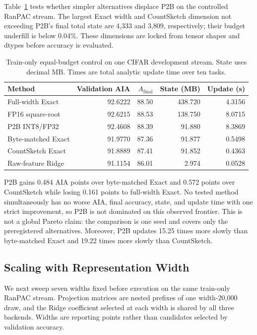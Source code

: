 \documentclass[runningheads]{llncs}
\begin{document}
Table~\ref{tab:equal-budget} tests whether simpler alternatives displace P2B
on the controlled RanPAC stream. The largest Exact width and CountSketch
dimension not exceeding P2B's final total state are 4,333 and 3,809,
respectively; their budget underfill is below 0.04\%. These dimensions are
locked from tensor shapes and dtypes before accuracy is evaluated.

\begin{table}
\caption{Train-only equal-budget control on one CIFAR development stream.
State uses decimal MB. Times are total analytic update time over ten tasks.}
\label{tab:equal-budget}
\centering
\small
\begin{tabular}{lrrrr}
\toprule
Method & Validation AIA & $A_{\mathrm{final}}$ & State (MB) & Update (s) \\
\midrule
Full-width Exact & 92.6222 & 88.50 & 438.720 & 4.3156 \\
FP16 square-root & 92.6215 & 88.53 & 138.750 & 8.0715 \\
P2B INT8/FP32 & 92.4608 & 88.39 & 91.880 & 8.3869 \\
Byte-matched Exact & 91.9770 & 87.36 & 91.877 & 0.5498 \\
CountSketch Exact & 91.8889 & 87.41 & 91.852 & 0.4363 \\
Raw-feature Ridge & 91.1154 & 86.01 & 2.974 & 0.0528 \\
\bottomrule
\end{tabular}
\end{table}

P2B gains 0.484 AIA points over byte-matched Exact and 0.572 points over
CountSketch while losing 0.161 points to full-width Exact. No tested method
simultaneously has no worse AIA, final accuracy, state, and update time with
one strict improvement, so P2B is not dominated on this observed frontier.
This is not a global Pareto claim: the comparison is one seed and covers only
the preregistered alternatives. Moreover, P2B updates 15.25 times more slowly
than byte-matched Exact and 19.22 times more slowly than CountSketch.

\subsection{Scaling with Representation Width}

We next sweep seven widths fixed before execution on the same train-only
RanPAC stream. Projection matrices are nested prefixes of one width-20,000
draw, and the Ridge coefficient selected at each width is shared by all three
backends. Widths are reporting points rather than candidates selected by
validation accuracy.
\end{document}
